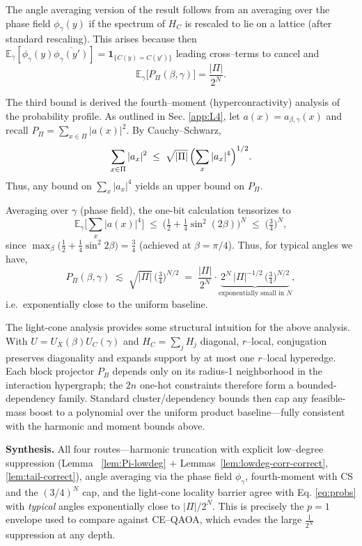 \documentclass[a4paper,onecolumn,11pt,unpublished]{quantumarticle}
\theoremstyle{remark}
\begin{document}
\medskip
\noindent
The angle averaging version of the result follows from an averaging over the phase field $\phi_\gamma(y)$ if the spectrum of $H_C$ is rescaled to lie on a lattice (after standard rescaling). This  arises because then $\mathbb{E}_\gamma[\phi_\gamma(y)\overline{\phi_\gamma(y')}]=\mathbf{1}_{\{C(y)=C(y')\}}$ leading cross–terms to cancel and
\[
\mathbb{E}_\gamma\big[P_\Pi(\beta,\gamma)\big]=\frac{|\Pi|}{2^N}.
\]

\medskip
\noindent
The third bound is derived the fourth–moment (hyperconractivity) analysis of the probability profile.  As outlined in Sec. \ref{app:L4}, let $a(x)=a_{\beta,\gamma}(x)$ and recall $P_\Pi=\sum_{x\in\Pi}|a(x)|^2$. 
By Cauchy–Schwarz,
\begin{equation}
  \sum_{x\in\Pi} |a_x|^2 \;\le\; \sqrt{|\Pi|}\,\Bigl(\sum_{x}|a_x|^4\Bigr)^{1/2}.
  \label{eq:CS-L4m}
\end{equation}
Thus, any bound on $\sum_x |a_x|^4$ yields an upper bound on $P_{\Pi}$.


Averaging over $\gamma$ (phase field), the one-bit calculation tensorizes to
\[
\mathbb{E}_\gamma\!\Big[\sum_x |a(x)|^4\Big]
\;\le\;\Big(\tfrac12+\tfrac14\sin^2(2\beta)\Big)^{\!N}
\;\le\;\Big(\tfrac34\Big)^{\!N},
\]
since $\max_{\beta}\big(\tfrac12+\tfrac14\sin^2 2\beta\big)=\tfrac34$ (achieved at $\beta=\pi/4$). 
Thus, for typical angles we have,
\[
P_\Pi(\beta,\gamma)
\;\lesssim\; \sqrt{|\Pi|}\,\Big(\tfrac34\Big)^{N/2}
\;=\; \frac{|\Pi|}{2^N}\cdot \underbrace{2^N\,|\Pi|^{-1/2}\,\Big(\tfrac34\Big)^{N/2}}_{\text{exponentially small in }N},
\]
i.e.\ exponentially close to the uniform baseline.

\medskip
\noindent
The light-cone analysis provides some structural intuition for the  above analysis. With $U=U_X(\beta)U_C(\gamma)$ and $H_C=\sum_j H_j$ diagonal, $r$–local, conjugation preserves diagonality and expands support by at most one $r$–local hyperedge. Each block projector $P_B$ depends only on its radius-1 neighborhood in the interaction hypergraph; the $2n$ one-hot constraints therefore form a bounded-dependency family. Standard cluster/dependency bounds then cap any feasible-mass boost to a polynomial over the uniform product baseline—fully consistent with the harmonic and moment bounds above.

\medskip
\noindent\textbf{Synthesis.}
All four routes—harmonic truncation with explicit low–degree suppression (Lemma ~\ref{lem:Pi-lowdeg} + Lemmas~\ref{lem:lowdeg-corr-correct},\ref{lem:tail-correct}), angle averaging via the phase field $\phi_\gamma$, fourth-moment with CS and the $(3/4)^N$ cap, and the light-cone locality barrier agree with Eq. \ref{eq:probs} with \emph{typical} angles exponentially close to $|\Pi|/2^N$. This is precisely the $p{=}1$ envelope used to compare against CE–QAOA, which evades the large $\frac{1}{2^N}$ suppression at any depth.
\end{document}
